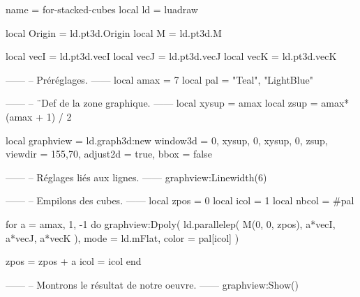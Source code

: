 \documentclass[border = 3pt]{standalone}
\begin{document}
\begin{luadraw*}{name = for-stacked-cubes}
local ld = luadraw

local Origin = ld.pt3d.Origin
local M      = ld.pt3d.M

local vecI = ld.pt3d.vecI
local vecJ = ld.pt3d.vecJ
local vecK = ld.pt3d.vecK

------
-- Préréglages.
------
local amax = 7
local pal  = {"Teal", "LightBlue"}

------
-- ¨Def de la zone graphique.
------
local xysup = amax
local zsup  = amax*(amax + 1) / 2

local graphview = ld.graph3d:new{
  window3d = {0, xysup, 0, xysup, 0, zsup},
  viewdir  = {155,70},
  adjust2d = true,
  bbox     = false
}

------
-- Réglages liés aux lignes.
------
graphview:Linewidth(6)


------
-- Empilons des cubes.
------
local zpos  = 0
local icol  = 1
local nbcol = #pal

for a = amax, 1, -1 do
  graphview:Dpoly(
    ld.parallelep(
      M(0, 0, zpos),
      a*vecI, a*vecJ, a*vecK
    ),
    {
      mode  = ld.mFlat,
      color = pal[icol]
    }
  )

  zpos = zpos + a
  icol = icol %
end

------
-- Montrons le résultat de notre oeuvre.
------
graphview:Show()
\end{luadraw*}
\end{document}
